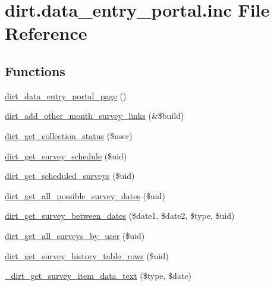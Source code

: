 \hypertarget{dirt_8data__entry__portal_8inc}{}\section{dirt.\+data\+\_\+entry\+\_\+portal.\+inc File Reference}
\label{dirt_8data__entry__portal_8inc}
\subsection*{Functions}
\begin{DoxyCompactItemize}
\item 
\mbox{\hyperlink{dirt_8data__entry__portal_8inc_aa5173486cfbb2dfba5f3aa63948d3172}{dirt\+\_\+data\+\_\+entry\+\_\+portal\+\_\+page}} ()
\item 
\mbox{\hyperlink{dirt_8data__entry__portal_8inc_a1b0f1d1ac87f1540ab022f3864f4208f}{dirt\+\_\+add\+\_\+other\+\_\+month\+\_\+survey\+\_\+links}} (\&\$build)
\item 
\mbox{\hyperlink{dirt_8data__entry__portal_8inc_a9e003975ac5081aa9b52a90da898db3f}{dirt\+\_\+get\+\_\+collection\+\_\+status}} (\$user)
\item 
\mbox{\hyperlink{dirt_8data__entry__portal_8inc_a7c65d904f5033eec0302f3ad738c39bb}{dirt\+\_\+get\+\_\+survey\+\_\+schedule}} (\$uid)
\item 
\mbox{\hyperlink{dirt_8data__entry__portal_8inc_ae4c40b6bbf92c870463a253683d53e0e}{dirt\+\_\+get\+\_\+scheduled\+\_\+surveys}} (\$uid)
\item 
\mbox{\hyperlink{dirt_8data__entry__portal_8inc_aaeb9cd2dfb102c823435ec038354ec1a}{dirt\+\_\+get\+\_\+all\+\_\+possible\+\_\+survey\+\_\+dates}} (\$uid)
\item 
\mbox{\hyperlink{dirt_8data__entry__portal_8inc_af98bdaa6d587757923a538b81bc5a1e8}{dirt\+\_\+get\+\_\+survey\+\_\+between\+\_\+dates}} (\$date1, \$date2, \$type, \$uid)
\item 
\mbox{\hyperlink{dirt_8data__entry__portal_8inc_afebafe4c940cc0c88fd34369b8478af7}{dirt\+\_\+get\+\_\+all\+\_\+surveys\+\_\+by\+\_\+user}} (\$uid)
\item 
\mbox{\hyperlink{dirt_8data__entry__portal_8inc_a82b48635efab6c02f1ac87e09da49f3f}{dirt\+\_\+get\+\_\+survey\+\_\+history\+\_\+table\+\_\+rows}} (\$uid)
\item 
\mbox{\hyperlink{dirt_8data__entry__portal_8inc_ac25467cfc1118143416a0d182fb13c71}{\+\_\+dirt\+\_\+get\+\_\+survey\+\_\+item\+\_\+data\+\_\+text}} (\$type, \$date)

\end{DoxyCompactItemize}
